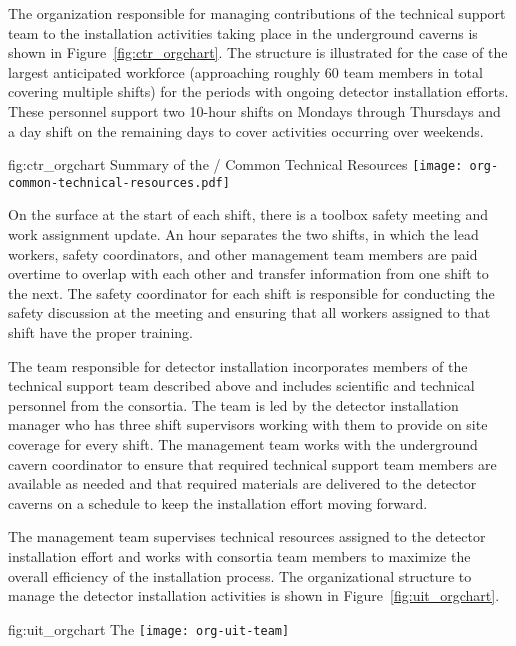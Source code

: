The organization responsible for managing contributions of 
the technical support team to the installation 
activities taking place in the underground caverns is shown 
in Figure~\ref{fig:ctr_orgchart}.  The structure is illustrated
for the case of the largest anticipated workforce (approaching 
roughly 60 team members in total covering multiple shifts) 
for the periods with ongoing detector installation efforts.
These personnel support two 10-hour shifts on Mondays through 
Thursdays and a day shift on the remaining days to cover 
activities occurring over weekends. 
\begin{dunefigure}{fig:ctr_orgchart}
  {Summary of the / Common Technical Resources}
  \texttt{[image: org-common-technical-resources.pdf]}
\end{dunefigure}

On the surface at the start of each shift, there is a toolbox safety
meeting and work assignment update. An hour separates the two shifts,
in which the lead workers, safety coordinators, and other management
team members are paid overtime to overlap with each other and
transfer information from one shift to the next. The safety
coordinator for each shift is responsible for conducting the safety
discussion at the meeting and ensuring that all workers assigned to
that shift have the proper training.

The team responsible for detector installation incorporates 
members of the technical support team described above 
and includes scientific and technical personnel from 
the  consortia.  The team is led by the detector
installation manager who has three shift supervisors working 
with them to provide on site coverage for every shift.
The management team works with the underground cavern
coordinator to ensure that required technical support team 
members are available as needed and that required materials 
are delivered to the detector caverns on a schedule to keep
the installation effort moving forward.         

The management team supervises technical resources assigned to 
the detector installation effort and works with consortia 
team members to maximize the overall efficiency of the installation 
process.  The organizational structure to manage the detector 
installation activities is shown in Figure~\ref{fig:uit_orgchart}.
\begin{dunefigure}{fig:uit_orgchart}
  {The }
  \texttt{[image: org-uit-team]}
\end{dunefigure}

